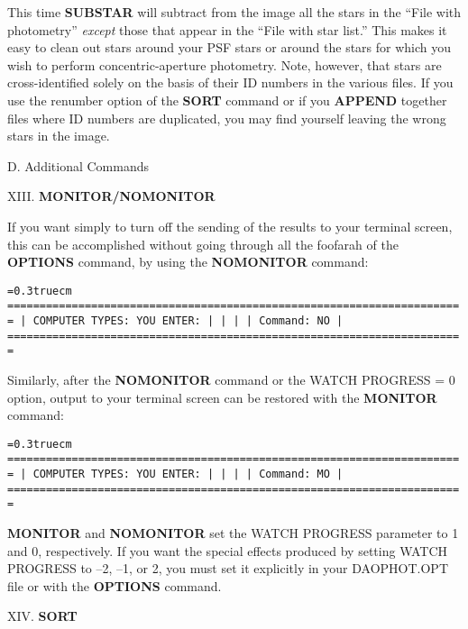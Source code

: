 This time {\bf SUBSTAR} will subtract from the image all the stars
in the ``File with photometry'' {\it except\/} those that appear
in the ``File with star list.''  This makes it easy to clean out stars
around your PSF stars or around the stars for which you wish to perform
concentric-aperture photometry.  Note, however, that stars are
cross-identified solely on the basis of their ID numbers in the various
files.  If you use the renumber option of the {\bf SORT} command or
if you {\bf APPEND} together files where ID numbers are duplicated,
you may find yourself leaving the wrong stars in the image.

\vfill
\eject
\centerline{D.  Additional Commands}
\noindent XIII.  {\bf MONITOR/NOMONITOR}

If you want simply to turn off the sending of the results to your
terminal screen, this can be accomplished without going through all the
foofarah of the {\bf OPTIONS} command, by using the {\bf NOMONITOR}
command:

\bigskip
{\noindent\obeylines\obeyspaces\frenchspacing\tt\baselineskip=0.3truecm
=======================================================================
| COMPUTER TYPES:                                  YOU ENTER:         |
|                                                                     |
| Command:                                         NO                 |
=======================================================================
}
\bigskip

\noindent Similarly, after the {\bf NOMONITOR} command or the WATCH
PROGRESS = 0 option, output to your terminal screen can be restored
with the {\bf MONITOR} command:

\bigskip
{\noindent\obeylines\obeyspaces\frenchspacing\tt\baselineskip=0.3truecm
=======================================================================
| COMPUTER TYPES:                                  YOU ENTER:         |
|                                                                     |
| Command:                                         MO                 |
=======================================================================
}
\bigskip

{\bf MONITOR} and {\bf NOMONITOR} set the WATCH PROGRESS parameter to 1
and 0, respectively.  If you want the special effects produced by
setting WATCH PROGRESS to --2, --1, or 2, you must set it explicitly in
your DAOPHOT.OPT file or with the {\bf OPTIONS} command.

\vfill
\eject
\noindent XIV.  {\bf SORT}

